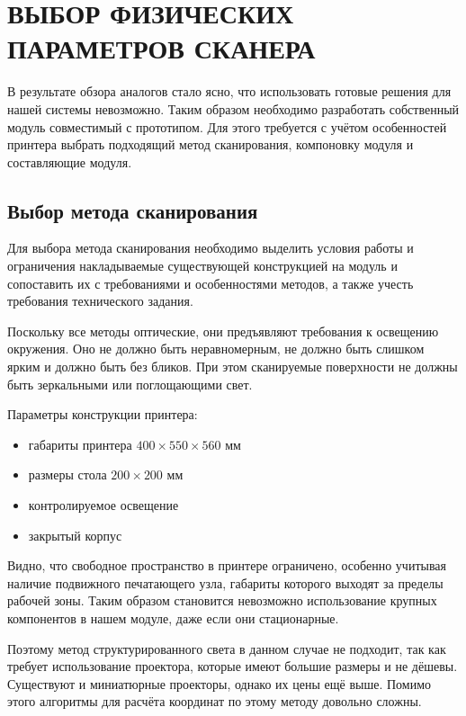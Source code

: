 \chapter{ВЫБОР ФИЗИЧЕСКИХ ПАРАМЕТРОВ СКАНЕРА}
    В результате обзора аналогов стало ясно, что использовать готовые решения для нашей системы невозможно. Таким образом необходимо разработать собственный модуль совместимый с прототипом. Для этого требуется с учётом особенностей принтера выбрать подходящий метод сканирования, компоновку модуля и составляющие модуля.
    \section{Выбор метода сканирования}
        Для выбора метода сканирования необходимо выделить условия работы и ограничения накладываемые существующей конструкцией на модуль и сопоставить их с требованиями и особенностями методов, а также учесть требования технического задания.
        
        Поскольку все методы оптические, они предъявляют требования к освещению окружения. Оно не должно быть неравномерным, не должно быть слишком ярким и должно быть без бликов. При этом сканируемые поверхности не должны быть зеркальными или поглощающими свет.
        
        Параметры конструкции принтера:
        \begin{itemize}
            \item габариты принтера $ 400 \times 550 \times 560 \text{ мм} $
            \item размеры стола $ 200 \times 200 \text{ мм} $
            \item контролируемое освещение
            \item закрытый корпус
        \end{itemize}
        
        Видно, что свободное пространство в принтере ограничено, особенно учитывая наличие подвижного печатающего узла, габариты которого выходят за пределы рабочей зоны. Таким образом становится невозможно использование крупных компонентов в нашем модуле, даже если они стационарные.

        Поэтому метод структурированного света в данном случае не подходит, так как требует использование проектора, которые имеют большие размеры и не дёшевы. Существуют и миниатюрные проекторы, однако их цены ещё выше. Помимо этого алгоритмы для расчёта координат по этому методу довольно сложны.

